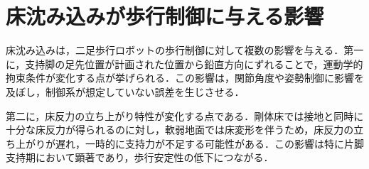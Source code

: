\section{床沈み込みが歩行制御に与える影響}

床沈み込みは，二足歩行ロボットの歩行制御に対して複数の影響を与える．第一に，支持脚の足先位置が計画された位置から鉛直方向にずれることで，運動学的拘束条件が変化する点が挙げられる．この影響は，関節角度や姿勢制御に影響を及ぼし，制御系が想定していない誤差を生じさせる．

第二に，床反力の立ち上がり特性が変化する点である．剛体床では接地と同時に十分な床反力が得られるのに対し，軟弱地面では床変形を伴うため，床反力の立ち上がりが遅れ，一時的に支持力が不足する可能性がある．この影響は特に片脚支持期において顕著であり，歩行安定性の低下につながる．